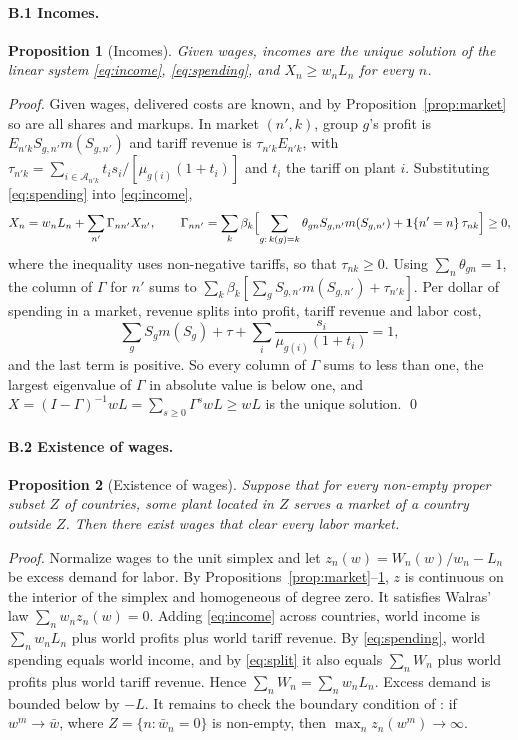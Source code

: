 \documentclass[11pt]{article}
\newtheorem{proposition}{Proposition}
\newcommand{\cA}{\mathcal A}
\begin{document}
\paragraph{B.1 Incomes.}\leavevmode
\begin{proposition}[Incomes]\label{prop:incomes}
Given wages, incomes are the unique solution of the linear system
\eqref{eq:income}, \eqref{eq:spending}, and $X_n\ge w_nL_n$ for every $n$.
\end{proposition}
\noindent\emph{Proof.} Given wages, delivered costs
are known, and by Proposition~\ref{prop:market} so are all shares and markups. In
market $(n',k)$, group $g$'s profit is $E_{n'k}S_{g,n'}m(S_{g,n'})$ and tariff revenue is
$\tau_{n'k}E_{n'k}$, with $\tau_{n'k}=\sum_{i\in\cA_{n'k}}t_is_i/[\mu_{g(i)}(1+t_i)]$
and $t_i$ the tariff on plant $i$. Substituting \eqref{eq:spending} into
\eqref{eq:income},
\[
  X_n=w_nL_n+\sum_{n'}\Gamma_{nn'}X_{n'},
  \qquad
  \Gamma_{nn'}=\sum_k\beta_k\Bigl[\sum_{g:\,k(g)=k}\theta_{gn}S_{g,n'}m(S_{g,n'})
  +\mathbf 1\{n'=n\}\,\tau_{nk}\Bigr]\ge0 ,
\]
where the inequality uses non-negative tariffs, so that $\tau_{nk}\ge0$.
Using $\sum_n\theta_{gn}=1$, the column of $\Gamma$ for $n'$ sums to
$\sum_k\beta_k[\sum_gS_{g,n'}m(S_{g,n'})+\tau_{n'k}]$. Per dollar of spending in a
market, revenue splits into profit, tariff revenue and labor cost,
\begin{equation}
  \sum_gS_gm(S_g)+\tau+\sum_i\frac{s_i}{\mu_{g(i)}(1+t_i)}=1,
  \tag{B.1}\label{eq:split}
\end{equation}
and the last term is positive. So every column of $\Gamma$ sums to less than one, the
largest eigenvalue of $\Gamma$ in absolute value is below one, and
$X=(I-\Gamma)^{-1}wL=\sum_{s\ge0}\Gamma^swL\ge wL$ is the unique solution. \qed

\paragraph{B.2 Existence of wages.}\leavevmode
\begin{proposition}[Existence of wages]\label{prop:exist}
Suppose that for every non-empty proper subset $Z$ of countries, some plant located in $Z$ serves
a market of a country outside $Z$. Then there exist wages that clear every labor
market.
\end{proposition}
\noindent\emph{Proof.} Normalize wages to the unit
simplex and let $z_n(w)=W_n(w)/w_n-L_n$ be excess demand for labor. By
Propositions~\ref{prop:market}--\ref{prop:incomes}, $z$ is continuous on the interior of
the simplex and homogeneous of degree zero. It satisfies Walras' law
$\sum_nw_nz_n(w)=0$. Adding \eqref{eq:income} across countries, world income is
$\sum_nw_nL_n$ plus world profits plus world tariff revenue. By \eqref{eq:spending},
world spending equals world income, and by \eqref{eq:split} it also equals
$\sum_nW_n$ plus world profits plus world tariff revenue. Hence
$\sum_nW_n=\sum_nw_nL_n$. Excess demand is bounded below by $-L$. It remains to check
the boundary condition of \citet[Proposition 17.C.1]{MWG1995}: if $w^m\to\bar w$, where
$Z=\{n:\bar w_n=0\}$ is non-empty, then $\max_nz_n(w^m)\to\infty$.
\end{document}
